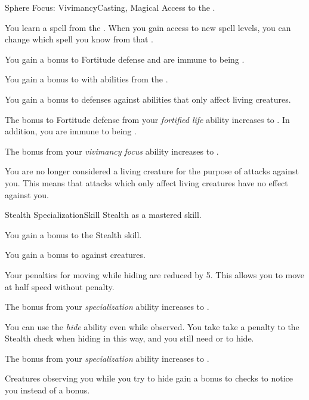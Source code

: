     \begin{feat}{Sphere Focus: Vivimancy}{Casting, Magical}
        \featpre Access to the  .

         You learn a spell from the  .
        When you gain access to new spell levels, you can change which spell you know from that .

         You gain a  bonus to Fortitude defense and are immune to being .

         You gain a  bonus to  with abilities from the  .

         You gain a  bonus to defenses against abilities that only affect living creatures.

         The bonus to Fortitude defense from your \textit{fortified life} ability increases to .
        In addition, you are immune to being .

         The bonus from your \textit{vivimancy focus} ability increases to .

         You are no longer considered a living creature for the purpose of attacks against you.
        This means that attacks which only affect living creatures have no effect against you.
    \end{feat}

    \begin{feat}{Stealth Specialization}{Skill}
        \featpre Stealth as a mastered skill.

         You gain a  bonus to the Stealth skill.

         You gain a  bonus to  against  creatures.

         Your penalties for moving while hiding are reduced by 5.
        This allows you to move at half speed without penalty.

         The bonus from your \textit{specialization} ability increases to .

         You can use the \textit{hide} ability even while observed.
        You take take a  penalty to the Stealth check when hiding in this way, and you still need  or  to hide.

         The bonus from your \textit{specialization} ability increases to .

         Creatures observing you while you try to hide gain a  bonus to checks to notice you instead of a  bonus.
    \end{feat}


